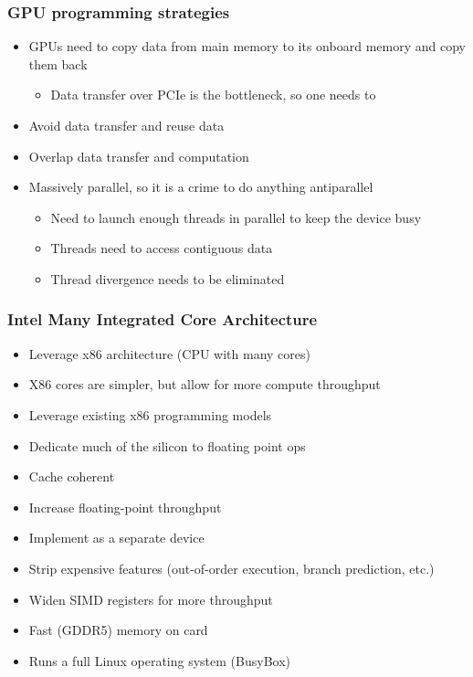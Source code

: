 \documentclass[10pt,t]{beamer}
\begin{document}
\begin{frame}
  \frametitle{GPU programming strategies}
  \begin{itemize}
  \item GPUs need to copy data from main memory to its onboard
    memory and copy them back
    \begin{itemize}
    \item Data transfer over PCIe is the bottleneck, so one needs to
    \end{itemize}
  \item Avoid data transfer and reuse data
  \item Overlap data transfer and computation
  \item Massively parallel, so it is a crime to do anything antiparallel
    \begin{itemize}
    \item Need to launch enough threads in parallel to keep the
      device busy
    \item Threads need to access contiguous data
    \item Thread divergence needs to be eliminated
    \end{itemize}
  \end{itemize}
\end{frame}

\begin{frame}
  \frametitle{Intel Many Integrated Core Architecture}
  \begin{itemize}
  \item Leverage x86 architecture (CPU with many cores)
  \item[] X86 cores are simpler, but allow for more compute throughput
  \item Leverage existing x86 programming models
  \item Dedicate much of the silicon to floating point ops
  \item Cache coherent
  \item Increase floating-point throughput
  \item Implement as a separate device
  \item Strip expensive features (out-of-order execution, branch prediction,
    etc.)
  \item Widen SIMD registers for more throughput
  \item Fast (GDDR5) memory on card
  \item Runs a full Linux operating system (BusyBox)
  \end{itemize}
\end{frame}
\end{document}
